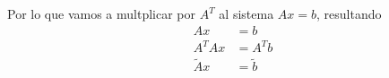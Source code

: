 \begin{frame}
\begin{solution}
		Por lo que vamos a multplicar por $A^{T}$ al sistema $Ax=b$, resultando
		\begin{align*}
			Ax             & =b             \\
			A^{T}Ax        & =A^{T}b        \\
			\widetilde{A}x & =\widetilde{b}
		\end{align*}

	\end{solution}
\end{frame}

\begin{frame}
	\begin{solution}
		\begin{minipage}{0.45\textwidth}
		\end{minipage}
		\begin{minipage}{0.45\textwidth}
		\end{minipage}
	\end{solution}
\end{frame}
